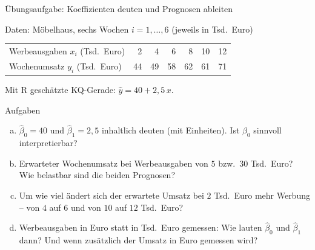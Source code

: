 \documentclass[aspectratio=169,11pt]{beamer}
\begin{document}
\begin{frame}{Übungsaufgabe: Koeffizienten deuten und Prognosen ableiten}
  \small
  \begin{block}{Daten: Möbelhaus, sechs Wochen $i = 1, \ldots, 6$ (jeweils in Tsd.\ Euro)}
    \vspace{-2pt}
    \begin{center}
      \renewcommand{\arraystretch}{1.0}
      \begin{tabular}{l*{6}{r}}
        \toprule
        Werbeausgaben $x_i$ (Tsd.\ Euro) & 2  & 4  & 6  & 8  & 10 & 12 \\
        Wochenumsatz $y_i$ (Tsd.\ Euro)  & 44 & 49 & 58 & 62 & 61 & 71 \\
        \bottomrule
      \end{tabular}
    \end{center}
    \vspace{-6pt}
    Mit R geschätzte KQ-Gerade: $\hat{y} = 40 + 2{,}5\,x$.
  \end{block}
  \vspace{-4pt}

  \begin{exampleblock}{Aufgaben}
    \begin{enumerate}[a)]
      \setlength{\itemsep}{1pt}
      \item $\hat{\beta}_0 = 40$ und $\hat{\beta}_1 = 2{,}5$ inhaltlich deuten (mit Einheiten).
            Ist $\hat{\beta}_0$ sinnvoll interpretierbar?
      \item Erwarteter Wochenumsatz bei Werbeausgaben von $5$ bzw.\ $30$ Tsd.\ Euro?
            Wie belastbar sind die beiden Prognosen?
      \item Um wie viel ändert sich der erwartete Umsatz bei $2$ Tsd.\ Euro mehr Werbung --
            von $4$ auf $6$ und von $10$ auf $12$ Tsd.\ Euro?
      \item Werbeausgaben in Euro statt in Tsd.\ Euro gemessen: Wie lauten $\hat{\beta}_0$ und
            $\hat{\beta}_1$ dann? Und wenn zusätzlich der Umsatz in Euro gemessen wird?
    \end{enumerate}
  \end{exampleblock}
\end{frame}
\end{document}

